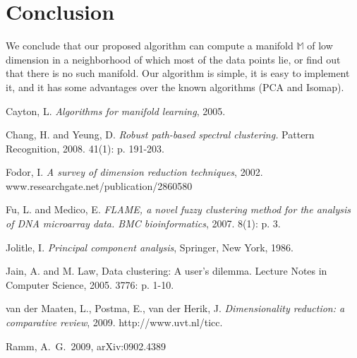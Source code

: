 \documentclass[12pt]{article}
\theoremstyle{plain}
\begin{document}
\section{Conclusion}\label{Conclusion}

We conclude that our proposed algorithm can compute a manifold $\mathbb{M}$ of low dimension in a neighborhood of which most of the data points lie, or find out that there is no such manifold. Our algorithm is simple, it is easy to implement it, and it has some advantages over the known algorithms (PCA and Isomap).

\newpage
\newpage
\begin{thebibliography}{1}

 Cayton, L. {\em Algorithms for manifold learning}, 2005.

 Chang, H. and  Yeung, D. {\em Robust path-based spectral clustering.} Pattern Recognition, 2008. 41(1): p. 191-203.

 Fodor, I. {\em A survey of dimension reduction techniques}, 2002. www.researchgate.net/publication/2860580

 Fu, L. and  Medico, E. {\em FLAME, a novel fuzzy clustering method for the analysis of DNA microarray data. BMC bioinformatics}, 2007. 8(1): p. 3.

 Jolitle, I. {\em Principal component analysis}, Springer, New York, 1986.

 Jain, A. and M. Law, Data clustering: A user's dilemma. Lecture Notes in Computer Science, 2005. 3776: p. 1-10. 

 van der Maaten, L., Postma, E., van der Herik, J. {\em Dimensionality reduction: a comparative review}, 2009. http://www.uvt.nl/ticc.

 Ramm, A.~G.\ 2009,
arXiv:0902.4389

\end{thebibliography}
\end{document}

